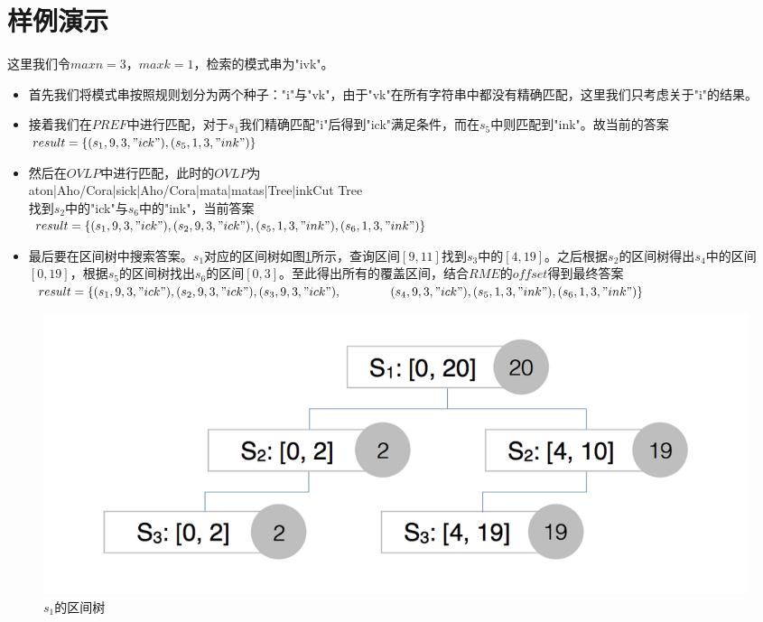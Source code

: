 ﻿\documentclass{sysuthesis}
\begin{document}
\section{样例演示}
这里我们令$maxn = 3$，$maxk = 1$，检索的模式串为"ivk"。\par
\begin{itemize}
	\item 首先我们将模式串按照规则划分为两个种子："i"与"vk"，由于"vk"在所有字符串中都没有精确匹配，这里我们只考虑关于"i"的结果。
	\item 接着我们在$PREF$中进行匹配，对于$s_{1}$我们精确匹配"i"后得到"ick"满足条件，而在$s_{5}$中则匹配到"ink"。故当前的答案\\
		$result = \{(s_{1}, 9, 3, "ick"), (s_{5}, 1, 3, "ink")\}$
	\item 然后在$OVLP$中进行匹配，此时的$OVLP$为\\
		aton|Aho/Cora|sick|Aho/Cora|mata|matas|Tree|inkCut Tree\\
		找到$s_{2}$中的"ick"与$s_{6}$中的"ink"，当前答案\\
		$result = \{(s_{1}, 9, 3, "ick"), (s_{2}, 9, 3, "ick"), (s_{5}, 1, 3, "ink"), (s_{6}, 1, 3, "ink")\}$
	\item 最后要在区间树中搜索答案。$s_{1}$对应的区间树如图\ref{image:intvtree1}所示，查询区间$[9, 11]$找到$s_{3}$中的$[4, 19]$。之后根据$s_{2}$的区间树得出$s_{4}$中的区间$[0, 19]$，根据$s_{5}$的区间树找出$s_{6}$的区间$[0, 3]$。至此得出所有的覆盖区间，结合$RME$的$offset$得到最终答案\\
		$result = \{(s_{1}, 9, 3, "ick"), (s_{2}, 9, 3, "ick"), (s_{3}, 9, 3, "ick"),\\
		{\qquad \qquad}(s_{4}, 9, 3, "ick"), (s_{5}, 1, 3, "ink"), (s_{6}, 1, 3, "ink")\}$
\end{itemize}

\begin{figure}[htbp]
	\centering
	\includegraphics[scale=0.35]{image/intvtree1.png}
	\caption{$s_{1}$的区间树}\label{image:intvtree1}
\end{figure}
\end{document}
